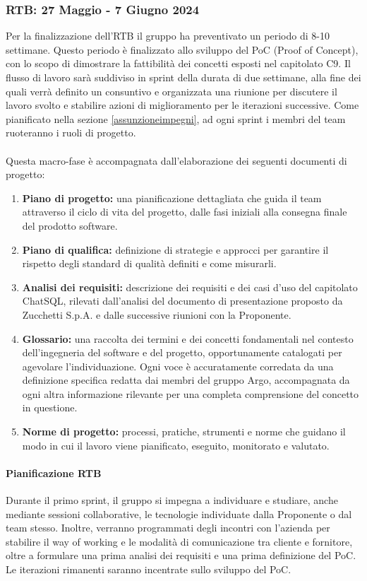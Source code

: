 \subsubsection{RTB: 27 Maggio - 7 Giugno 2024}
Per la finalizzazione dell’RTB il gruppo ha preventivato un periodo di 8-10 settimane. Questo periodo è finalizzato allo sviluppo del PoC (Proof of Concept), con lo scopo di dimostrare la fattibilità dei concetti esposti nel capitolato C9. Il flusso di lavoro sarà suddiviso in sprint della durata di due settimane, alla fine dei quali verrà definito un consuntivo e organizzata una riunione per discutere il lavoro svolto e stabilire azioni di miglioramento per le iterazioni successive. Come pianificato nella sezione \ref{assunzioneimpegni}, ad ogni sprint i membri del team ruoteranno i ruoli di progetto. \\
\\
Questa macro-fase è accompagnata dall’elaborazione dei seguenti documenti di progetto:
\begin{enumerate}
  \item \textbf{Piano di progetto:} una pianificazione dettagliata che guida il team attraverso il ciclo di vita del progetto, dalle fasi iniziali alla consegna finale del prodotto software.
  \item \textbf{Piano di qualifica:} definizione di strategie e approcci per garantire il rispetto degli standard di qualità definiti e come misurarli. 
  \item \textbf{Analisi dei requisiti:} descrizione dei requisiti e dei casi d'uso del capitolato ChatSQL, rilevati dall'analisi del documento di presentazione proposto da Zucchetti S.p.A. e dalle successive riunioni con la Proponente.
  \item \textbf{Glossario:} una raccolta dei termini e dei concetti fondamentali nel contesto dell'ingegneria del software e del progetto, opportunamente catalogati per agevolare l'individuazione. Ogni voce è accuratamente corredata da una definizione specifica redatta dai membri del gruppo Argo, accompagnata da ogni altra informazione rilevante per una completa comprensione del concetto in questione.
  \item \textbf{Norme di progetto:} processi, pratiche, strumenti e norme che guidano il modo in cui il lavoro viene pianificato, eseguito, monitorato e valutato.
\end{enumerate}

\paragraph{Pianificazione RTB}
Durante il primo sprint, il gruppo si impegna a individuare e studiare, anche mediante sessioni collaborative, le tecnologie individuate dalla Proponente o dal team stesso. Inoltre, verranno programmati degli incontri con l’azienda per stabilire il way of working e le modalità di comunicazione tra cliente e fornitore, oltre a formulare una prima analisi dei requisiti e una prima definizione del PoC. Le iterazioni rimanenti saranno incentrate sullo sviluppo del PoC.

